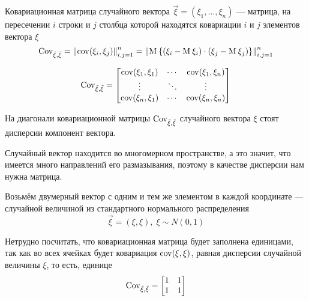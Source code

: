 \begin{definition}
    \label{def:vectorCovMatrix}

    Ковариационная матрица случайного вектора
    $\vec{\xi} = \left( \xi_1, \dots, \xi_n \right)$ --- матрица, на пересечении
    $i$ строки и $j$ столбца которой находятся ковариации $i$ и $j$ элементов
    вектора $\xi$
    $$\operatorname{Cov^{}_{\vec{\xi}, \vec{\xi}}}
        = \left\| \operatorname{cov}\!\left( \xi_i, \xi_j \right) \right\|_{i,j=1}^n
        = \left\| \operatorname{M}_{} 
            \left\{ \left( \xi_i - \operatorname{M}_{} \xi_i \right)
                \cdot \left( \xi_j - \operatorname{M}_{} \xi_j \right)
            \right\} \right\|_{i,j=1}^n$$

    $$\operatorname{Cov^{}_{\vec{\xi}, \vec{\xi}}} =
    \begin{bmatrix}
        \operatorname{cov}\!\left( \xi_1, \xi_1 \right) & \cdots & \operatorname{cov}\!\left( \xi_1, \xi_n \right) \\
        \vdots & \ddots & \vdots \\
        \operatorname{cov}\!\left( \xi_n, \xi_1 \right) & \cdots & \operatorname{cov}\!\left( \xi_n, \xi_n \right)
    \end{bmatrix}$$

\end{definition}

\begin{remark}
    На диагонали ковариационной матрицы $\operatorname{Cov^{}_{\vec{\xi}, \vec{\xi}}}$
    случайного вектора $\xi$ стоят дисперсии компонент вектора.
\end{remark}

Случайный вектор находится во многомерном пространстве, а это значит,
что имеется много направлений его размазывания, поэтому в качестве дисперсии
нам нужна матрица.

\begin{example}
    Возьмём двумерный вектор с одним и тем же элементом
    в каждой координате --- случайной величиной из стандартного нормального
    распределения
    $$\vec{\xi} = \left( \xi, \xi \right),\; \xi \sim N\left( 0, 1 \right)$$

    Нетрудно посчитать, что ковариационная матрица будет заполнена единицами,
    так как во всех ячейках будет ковариация $\operatorname{cov}\!\left( \xi, \xi \right)$, равная
    дисперсии случайной величины $\xi$, то есть, единице
    $$\operatorname{Cov^{}_{\vec{\xi}, \vec{\xi}}} =
    \begin{bmatrix}
        1 & 1 \\
        1 & 1
    \end{bmatrix}$$
\end{example}

